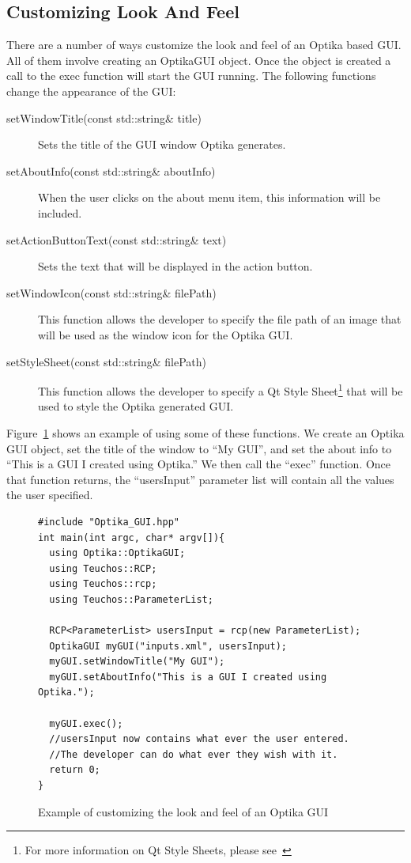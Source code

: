 \subsection{Customizing Look And Feel}
There are a number of ways customize the look and feel of an Optika based GUI. All of them involve creating an OptikaGUI object. Once the object is created a call to the
exec function will start the GUI running. The following functions change the appearance of the GUI:
\begin{description}
\item[setWindowTitle(const std::string\& title)] Sets the title of the GUI window Optika generates.
\item[setAboutInfo(const std::string\& aboutInfo)] When the user clicks on the about menu item, this information will be included.
\item[setActionButtonText(const std::string\& text)] Sets the text that will be displayed in the action button.
\item[setWindowIcon(const std::string\& filePath)] This function allows the developer to specify the file path of an image that will be used as the window icon for the 
Optika GUI.
\item[setStyleSheet(const std::string\& filePath)] This function allows the developer to specify a Qt Style Sheet\footnote{For more information on Qt Style Sheets, please 
see~\cite{QtStyle}} that will be used to style the Optika generated GUI.
\end{description}

Figure~\ref{lookGui} shows an example of using some of these functions. We create an Optika GUI object, set the title of the window to ``My GUI'', and set the
about info to ``This is a GUI I created using Optika.'' We then call the ``exec'' function. Once that function returns, the ``usersInput'' parameter list will contain all 
the values the user specified.
\begin{figure}
\centering
{\footnotesize
\begin{verbatim}
#include "Optika_GUI.hpp"
int main(int argc, char* argv[]){
  using Optika::OptikaGUI;
  using Teuchos::RCP;
  using Teuchos::rcp;
  using Teuchos::ParameterList;

  RCP<ParameterList> usersInput = rcp(new ParameterList);
  OptikaGUI myGUI("inputs.xml", usersInput);
  myGUI.setWindowTitle("My GUI");
  myGUI.setAboutInfo("This is a GUI I created using Optika.");

  myGUI.exec();
  //usersInput now contains what ever the user entered.
  //The developer can do what ever they wish with it.
  return 0;
}
\end{verbatim}
}
\caption{Example of customizing the look and feel of an Optika GUI}
\label{lookGui}
\end{figure}

